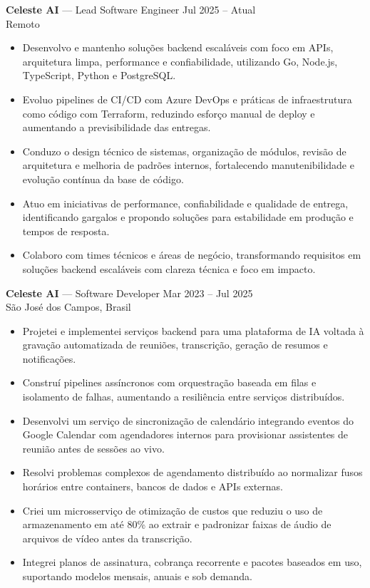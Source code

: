 \documentclass[11pt,a4paper]{article}
\begin{document}
\textbf{Celeste AI} — Lead Software Engineer \hfill Jul 2025 – Atual \\
Remoto
\vspace{-4pt}
\begin{itemize}[leftmargin=*]
  \item Desenvolvo e mantenho soluções backend escaláveis com foco em APIs, arquitetura limpa, performance e confiabilidade, utilizando Go, Node.js, TypeScript, Python e PostgreSQL.
  \item Evoluo pipelines de CI/CD com Azure DevOps e práticas de infraestrutura como código com Terraform, reduzindo esforço manual de deploy e aumentando a previsibilidade das entregas.
  \item Conduzo o design técnico de sistemas, organização de módulos, revisão de arquitetura e melhoria de padrões internos, fortalecendo manutenibilidade e evolução contínua da base de código.
  \item Atuo em iniciativas de performance, confiabilidade e qualidade de entrega, identificando gargalos e propondo soluções para estabilidade em produção e tempos de resposta.
  \item Colaboro com times técnicos e áreas de negócio, transformando requisitos em soluções backend escaláveis com clareza técnica e foco em impacto.
\end{itemize}

\vspace{8pt}
\textbf{Celeste AI} — Software Developer \hfill Mar 2023 – Jul 2025 \\
São José dos Campos, Brasil
\vspace{-4pt}
\begin{itemize}[leftmargin=*]
  \item Projetei e implementei serviços backend para uma plataforma de IA voltada à gravação automatizada de reuniões, transcrição, geração de resumos e notificações.
  \item Construí pipelines assíncronos com orquestração baseada em filas e isolamento de falhas, aumentando a resiliência entre serviços distribuídos.
  \item Desenvolvi um serviço de sincronização de calendário integrando eventos do Google Calendar com agendadores internos para provisionar assistentes de reunião antes de sessões ao vivo.
  \item Resolvi problemas complexos de agendamento distribuído ao normalizar fusos horários entre containers, bancos de dados e APIs externas.
  \item Criei um microsserviço de otimização de custos que reduziu o uso de armazenamento em até 80\% ao extrair e padronizar faixas de áudio de arquivos de vídeo antes da transcrição.
  \item Integrei planos de assinatura, cobrança recorrente e pacotes baseados em uso, suportando modelos mensais, anuais e sob demanda.
\end{itemize}
\end{document}
